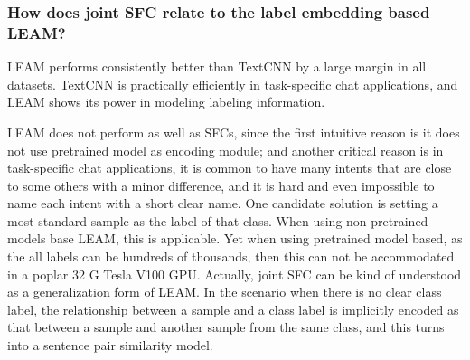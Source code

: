 \subsubsection*{How does joint SFC relate to the label  embedding based  LEAM?}
LEAM performs consistently better than TextCNN by a large margin in all
datasets. TextCNN is practically efficiently in task-specific chat
applications, and LEAM shows its power in modeling labeling information.

LEAM  does not perform as well as SFCs, since the first intuitive reason is it
does  not use pretrained model as encoding module; and another critical reason
is  in  task-specific  chat applications, it is common to have many intents
that are close to some others with a minor difference, and it is hard and even
impossible  to  name  each  intent  with  a short clear name. One candidate
solution  is  setting  a most standard sample as the label of that class. When
using  non-pretrained  models  base  LEAM,  this is applicable. Yet when using
pretrained  model  based, as the all labels can be hundreds of thousands, then
this  can not be accommodated in a poplar 32 G Tesla V100 GPU. Actually, joint
SFC  can  be  kind  of  understood  as  a  generalization form of LEAM. In the
scenario when there is no clear class label, the relationship between a sample
and  a class label is implicitly encoded as that between a sample and another
sample  from  the  same  class, and this turns into a sentence pair similarity
model.


